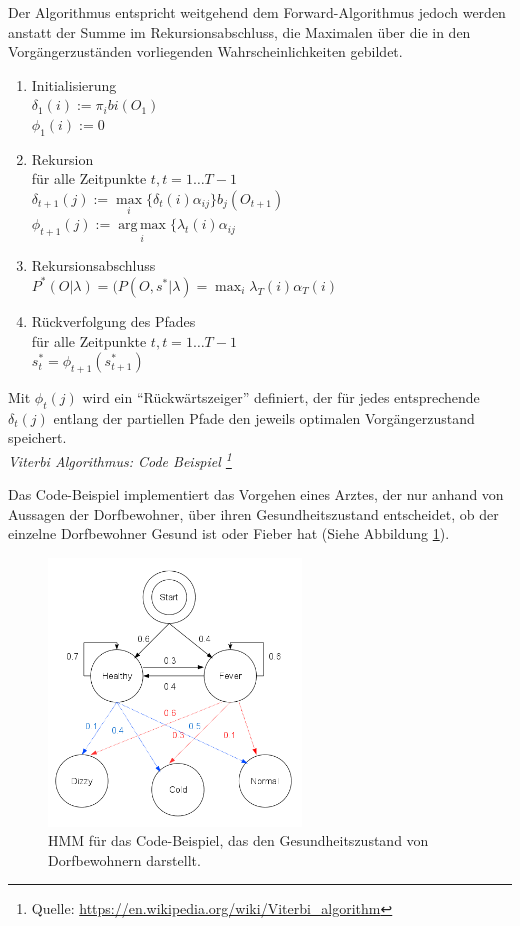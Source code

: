 Der Algorithmus entspricht weitgehend dem Forward-Algorithmus jedoch werden anstatt der Summe im Rekursionsabschluss, die Maximalen über die in den Vorgängerzuständen vorliegenden Wahrscheinlichkeiten gebildet.
\begin{enumerate}
  \item Initialisierung\\
		\(\delta_{1}(i) := \pi_{i}b{i}(O_{1})\)\\
		\(\phi_{1}(i):=0\)
  \item Rekursion\\
	für alle Zeitpunkte \(t, t=1 \ldots T-1\)\\
	\(\delta_{t+1}(j) :=
	\max\limits_{i}\{\delta_{t}(i)\alpha_{ij}\}b_{j}(O_{t+1})\)\\
	\(\phi_{t+1}(j):= \operatorname{arg\,max}\limits_{i}\{\lambda_{t}(i)\alpha_{ij} \)
  \item Rekursionsabschluss\\
  	\(P^{*}(O|\lambda) = (P(O,s^{*}|\lambda) = \max_{i}\lambda_{T}(i)
  	\alpha_{T}(i)\)
  \item Rückverfolgung des Pfades\\
	für alle Zeitpunkte \(t, t=1 \ldots T-1\)\\
	\(s_{t}^{*}=\phi_{t+1}(s_{t+1}^{*})\)
\end{enumerate}
Mit $\phi_{t}(j)$ wird ein ``Rückwärtszeiger'' definiert, der für jedes
entsprechende $\delta_{t}(j)$ entlang der partiellen Pfade den jeweils
optimalen Vorgängerzustand speichert. \\

\textit{Viterbi Algorithmus: Code Beispiel \footnote{Quelle: \url{https://en.wikipedia.org/wiki/Viterbi_algorithm}}}

Das Code-Beispiel implementiert das Vorgehen eines Arztes, der nur anhand von Aussagen der Dorfbewohner, über ihren Gesundheitszustand entscheidet, ob der einzelne Dorfbewohner Gesund ist oder Fieber hat (Siehe Abbildung \ref{fig:viterbi_example}).

\begin{figure}[htbp] \centering
    \includegraphics[width=0.6\textwidth]{Bilder/Kap3/picture_viterbi}
    \caption{HMM für das Code-Beispiel, das den Gesundheitszustand von Dorfbewohnern darstellt.}
    \label{fig:viterbi_example}
\end{figure}

